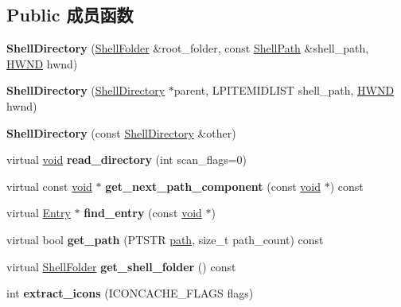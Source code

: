 \subsection*{Public 成员函数}
\begin{DoxyCompactItemize}
\item 
\mbox{\label{struct_shell_directory_af3dfaf11610e25fa2cde67b286a47948}} 
{\bfseries Shell\+Directory} (\hyperlink{struct_shell_folder}{Shell\+Folder} \&root\+\_\+folder, const \hyperlink{struct_shell_path}{Shell\+Path} \&shell\+\_\+path, \hyperlink{interfacevoid}{H\+W\+ND} hwnd)
\item 
\mbox{\label{struct_shell_directory_a0c4f84640cfc4d5d804e7daf963f3b4e}} 
{\bfseries Shell\+Directory} (\hyperlink{struct_shell_directory}{Shell\+Directory} $\ast$parent, L\+P\+I\+T\+E\+M\+I\+D\+L\+I\+ST shell\+\_\+path, \hyperlink{interfacevoid}{H\+W\+ND} hwnd)
\item 
\mbox{\label{struct_shell_directory_aec2a8e0641a34a34520cb4518e71de5d}} 
{\bfseries Shell\+Directory} (const \hyperlink{struct_shell_directory}{Shell\+Directory} \&other)
\item 
\mbox{\label{struct_shell_directory_a67a98f03c13704875a3ba8a9290fd1ca}} 
virtual \hyperlink{interfacevoid}{void} {\bfseries read\+\_\+directory} (int scan\+\_\+flags=0)
\item 
\mbox{\label{struct_shell_directory_acafc2cc0af15afd1262e8e0b0e9153a3}} 
virtual const \hyperlink{interfacevoid}{void} $\ast$ {\bfseries get\+\_\+next\+\_\+path\+\_\+component} (const \hyperlink{interfacevoid}{void} $\ast$) const
\item 
\mbox{\label{struct_shell_directory_ad7619a6f9c80a85f5dda749ecaaf3197}} 
virtual \hyperlink{struct_entry}{Entry} $\ast$ {\bfseries find\+\_\+entry} (const \hyperlink{interfacevoid}{void} $\ast$)
\item 
\mbox{\label{struct_shell_directory_ae5f9c77d4dc355a67e799e7f2b7bf4c7}} 
virtual bool {\bfseries get\+\_\+path} (P\+T\+S\+TR \hyperlink{structpath}{path}, size\+\_\+t path\+\_\+count) const
\item 
\mbox{\label{struct_shell_directory_a2c3e8cb0b0041c47c2b4b2bcb0b3c01c}} 
virtual \hyperlink{struct_shell_folder}{Shell\+Folder} {\bfseries get\+\_\+shell\+\_\+folder} () const
\item 
\mbox{\label{struct_shell_directory_a24ee77ac5f0c82b982987da8dd25d4b1}} 
int {\bfseries extract\+\_\+icons} (I\+C\+O\+N\+C\+A\+C\+H\+E\+\_\+\+F\+L\+A\+GS flags)
\end{DoxyCompactItemize}
